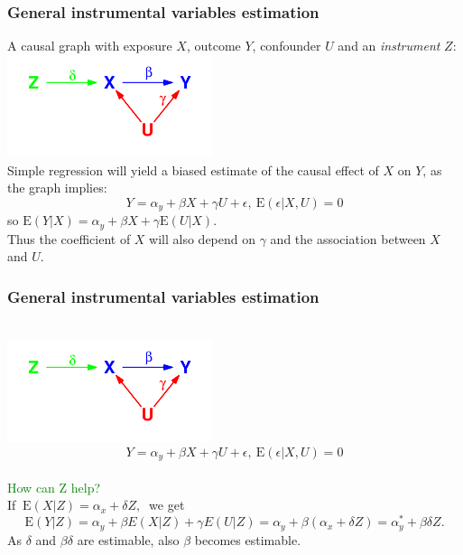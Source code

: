 \documentclass{beamer}
\newcommand{\E}{\mathrm{E}}
\begin{document}
\begin{frame}
 \frametitle{General instrumental variables estimation}
A causal graph with exposure $X$, outcome $Y$, confounder $U$ and an \emph{instrument} $Z$:\\
\includegraphics[width=6cm]{instvar} \\
Simple regression will yield a biased estimate of the causal effect of $X$ on $Y$, as the graph implies:
\[ Y= \alpha_y + \beta X + \gamma U +\epsilon,  \  \E(\epsilon|X,U)=0 \]
so $\E(Y|X)= \alpha_y + \beta X + \gamma \E(U|X)$. \\
Thus the coefficient of $X$ will also depend on $\gamma$ and the association between $X$ and $U$. 
\end{frame}

\begin{frame}
 \frametitle{General instrumental variables estimation}
\mbox{ }\\[-1cm]
\includegraphics[width=6cm]{instvar} \\[-0.5cm]
\[ Y= \alpha_y + \beta X + \gamma U +\epsilon,  \  \E(\epsilon|X,U)=0 \]
\mbox{ }\\
\textcolor{green}{How can Z help?} \\
\pause
If $ \ \E(X|Z)=\alpha_x + \delta Z, \ $  we get  \pause
\[
\E(Y|Z) = \alpha_y + \beta E(X|Z) + \gamma E(U|Z)  =   \alpha_y + \beta(\alpha_x + \delta Z) = \alpha_y^* + \beta\delta Z. 
\]
\pause As $\delta$ and $\beta\delta$ are estimable, also $\beta$ becomes estimable. 
\end{frame}
\end{document}
